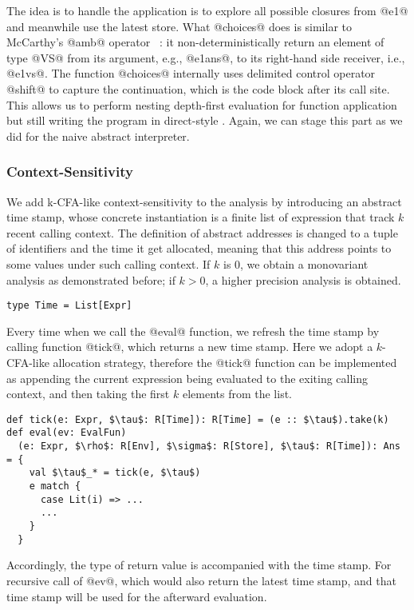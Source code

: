 The idea is to handle the application is to explore all possible closures from @e1@ and meanwhile
use the latest store.
What @choices@ does is similar to McCarthy's @amb@ operator ~\cite{MCCARTHY196333}: it non-deterministically return an
element of type @VS@ from its argument, e.g., @e1ans@, to its right-hand side receiver, i.e., @e1vs@.
The function @choices@ internally uses delimited control operator @shift@ to capture the continuation,
which is the code block after its call site. 
This allows us to perform nesting depth-first evaluation for function application but still writing 
the program in direct-style \cite{Wei:2018:RAA:3243631.3236800}. 
Again, we can stage this part as we did for the naive abstract interpreter.

\subsubsection{Context-Sensitivity}

We add k-CFA-like context-sensitivity to the analysis by introducing an abstract time stamp, 
whose concrete instantiation is a finite list of expression that track $k$ recent calling context.
The definition of abstract addresses is changed to a tuple of identifiers and the time it get allocated,
meaning that this address points to some values under such calling context.
If $k$ is 0, we obtain a monovariant analysis as demonstrated before; if $k > 0$, a higher precision
analysis is obtained.

\begin{lstlisting}
type Time = List[Expr]
\end{lstlisting}

Every time when we call the @eval@ function, we refresh the time stamp by calling function @tick@,
which returns a new time stamp. Here we adopt a $k$-CFA-like allocation strategy, therefore
the @tick@ function can be implemented as appending the current expression being evaluated to the exiting
calling context, and then taking the first $k$ elements from the list.

\begin{lstlisting}
def tick(e: Expr, $\tau$: R[Time]): R[Time] = (e :: $\tau$).take(k)
def eval(ev: EvalFun)
  (e: Expr, $\rho$: R[Env], $\sigma$: R[Store], $\tau$: R[Time]): Ans = {
    val $\tau$_* = tick(e, $\tau$)
    e match {
      case Lit(i) => ...
      ...
    }
  }
\end{lstlisting}

Accordingly, the type of return value is accompanied with the time stamp. For recursive call of @ev@,
which would also return the latest time stamp, and that time stamp will be used for the afterward evaluation.

